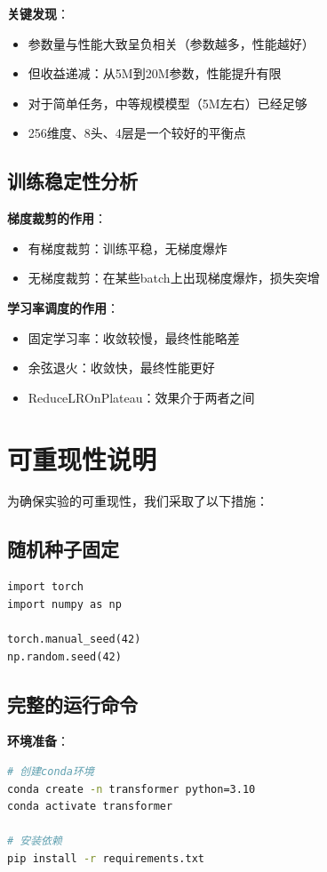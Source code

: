 \documentclass[UTF8,12pt,a4paper]{ctexart}
\begin{document}
\textbf{关键发现}：
\begin{itemize}
    \item 参数量与性能大致呈负相关（参数越多，性能越好）
    \item 但收益递减：从5M到20M参数，性能提升有限
    \item 对于简单任务，中等规模模型（5M左右）已经足够
    \item 256维度、8头、4层是一个较好的平衡点
\end{itemize}

\subsection{训练稳定性分析}

\textbf{梯度裁剪的作用}：
\begin{itemize}
    \item 有梯度裁剪：训练平稳，无梯度爆炸
    \item 无梯度裁剪：在某些batch上出现梯度爆炸，损失突增
\end{itemize}

\textbf{学习率调度的作用}：
\begin{itemize}
    \item 固定学习率：收敛较慢，最终性能略差
    \item 余弦退火：收敛快，最终性能更好
    \item ReduceLROnPlateau：效果介于两者之间
\end{itemize}

\section{可重现性说明}

为确保实验的可重现性，我们采取了以下措施：

\subsection{随机种子固定}

\begin{lstlisting}
import torch
import numpy as np

torch.manual_seed(42)
np.random.seed(42)
\end{lstlisting}

\subsection{完整的运行命令}

\textbf{环境准备}：
\begin{lstlisting}[language=bash]
# 创建conda环境
conda create -n transformer python=3.10
conda activate transformer

# 安装依赖
pip install -r requirements.txt
\end{lstlisting}
\end{document}
